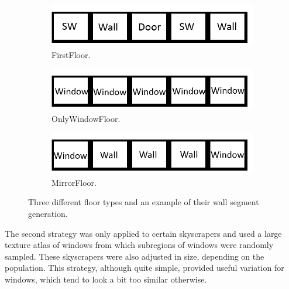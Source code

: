\begin{figure}[H]
  \centering
  \begin{subfigure}[b]{0.32\textwidth}
    \includegraphics[width=\textwidth]{figure/FirstFloor.png}
    \caption{FirstFloor.}
  \end{subfigure}
  \quad
  \begin{subfigure}[b]{0.32\textwidth}
    \includegraphics[width=\textwidth]{figure/OnlyWindowFloor.png}
    \caption{OnlyWindowFloor.}
  \end{subfigure}
  \begin{subfigure}[b]{0.32\textwidth}
    \includegraphics[width=\textwidth]{figure/MirrorFloor.png}
    \caption{MirrorFloor.}
  \end{subfigure}
  \caption{Three different floor types and an example of their wall segment generation.}
  \label{fig:segmentsgen}
\end{figure}

The second strategy was only applied to certain skyscrapers and used a large texture atlas of windows from which subregions of windows were randomly sampled.
These skyscrapers were also adjusted in size, depending on the population.
This strategy, although quite simple, provided useful variation for windows, which tend to look a bit too similar otherwise.


